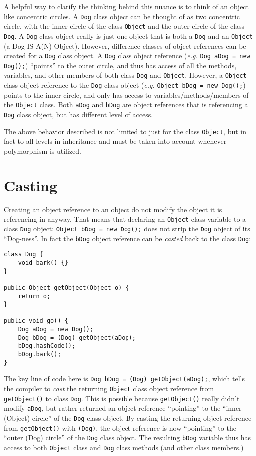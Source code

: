 \documentclass{tufte-handout}
\begin{document}
    A helpful way to clarify the thinking behind this nuance is to think of an object like concentric circles. A \texttt{Dog} class object can be thought of as two concentric circle, with the inner circle of the class \texttt{Object} and the outer circle of the class \texttt{Dog}. A \texttt{Dog} class object really is just one object that is both a \texttt{Dog} and an \texttt{Object} (a Dog IS-A(N) Object). However, difference classes of object references can be created for a \texttt{Dog} class object. A \texttt{Dog} class object reference (\textit{e.g.} \texttt{Dog aDog = new Dog();}) ``points'' to the outer circle, and thus has access of all the methods, variables, and other members of both class \texttt{Dog} and \texttt{Object}. However, a \texttt{Object} class object reference to the \texttt{Dog} class object (\textit{e.g.} \texttt{Object bDog = new Dog();}) points to the inner circle, and only has access to variables/methods/members of the \texttt{Object} class. Both \texttt{aDog} and \texttt{bDog} are object references that is referencing a \texttt{Dog} class object, but has different level of access.

    The above behavior described is not limited to just for the class \texttt{Object}, but in fact to all levels in inheritance and must be taken into account whenever polymorphism is utilized.

    \section*{Casting}
    Creating an object reference to an object do not modify the object it is referencing in anyway. That means that declaring an \texttt{Object} class variable to a class \texttt{Dog} object: \texttt{Object bDog = new Dog();} does not strip the \texttt{Dog} object of its ``Dog-ness''. In fact the \texttt{bDog} object reference can be \emph{casted} back to the class \texttt{Dog}:

    \begin{lstlisting}
class Dog {
    void bark() {}
}

public Object getObject(Object o) {
    return o;
}

public void go() {
    Dog aDog = new Dog();
    Dog bDog = (Dog) getObject(aDog);
    bDog.hashCode();
    bDog.bark();
}        
    \end{lstlisting}

    The key line of code here is \texttt{Dog bDog = (Dog) getObject(aDog);}, which tells the compiler to \emph{cast} the returning \texttt{Object} class object reference from \texttt{getObject()} to class \texttt{Dog}. This is possible because \texttt{getObject()} really didn't modify \texttt{aDog}, but rather returned an object reference ``pointing'' to the ``inner (Object) circle'' of the \texttt{Dog} class object. By casting the returning object reference from \texttt{getObject()} with \texttt{(Dog)}, the object reference is now ``pointing'' to the ``outer (Dog) circle'' of the \texttt{Dog} class object. The resulting \texttt{bDog} variable thus has access to both \texttt{Object} class and \texttt{Dog} class methods (and other class members.)
\end{document}
